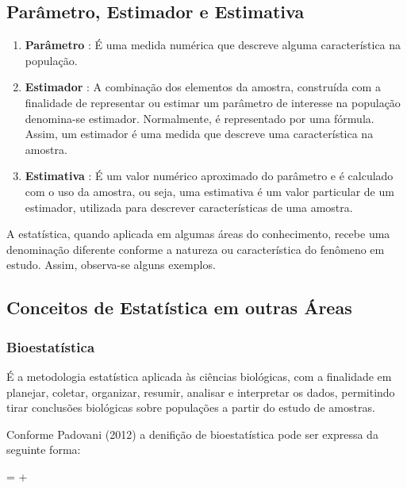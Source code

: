 \subsection{Parâmetro, Estimador e Estimativa}

\begin{enumerate}
\item \textbf{Parâmetro} : É uma medida numérica que descreve alguma característica na população.

\item \textbf{Estimador} : A combinação dos elementos da amostra,
construída com a finalidade de representar ou estimar um
parâmetro de interesse na população denomina-se estimador.
Normalmente, é representado por uma fórmula. Assim, um
estimador é uma medida que descreve uma característica na amostra.


\item \textbf{Estimativa} : É um valor numérico aproximado do
parâmetro e é calculado com o uso da amostra, ou seja, uma
estimativa é um valor particular de um estimador, utilizada para descrever características de uma amostra.
\end{enumerate}


A estatística, quando aplicada em algumas áreas do conhecimento,
recebe uma denominação diferente conforme a natureza ou
característica do fenômeno em estudo. Assim, observa-se alguns
exemplos.


\newpage
\subsection{Conceitos de Estatística em outras Áreas}
\subsubsection{Bioestatística}

É a metodologia estatística aplicada às ciências biológicas, com a finalidade em planejar, coletar, organizar, resumir, analisar e interpretar os dados,
permitindo tirar conclusões biológicas sobre populações a partir do estudo
de amostras.\vskip0.3cm

Conforme Padovani (2012) a denifição de bioestatística pode ser expressa da seguinte forma:

\begin{center}
 =  + 
\end{center}



